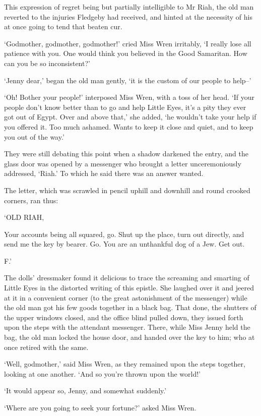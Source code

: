 This expression of regret being but partially intelligible to Mr Riah,
the old man reverted to the injuries Fledgeby had received, and hinted
at the necessity of his at once going to tend that beaten cur.

‘Godmother, godmother, godmother!’ cried Miss Wren irritably, ‘I really
lose all patience with you. One would think you believed in the Good
Samaritan. How can you be so inconsistent?’

‘Jenny dear,’ began the old man gently, ‘it is the custom of our people
to help--’

‘Oh! Bother your people!’ interposed Miss Wren, with a toss of her head.
‘If your people don’t know better than to go and help Little Eyes, it’s
a pity they ever got out of Egypt. Over and above that,’ she added, ‘he
wouldn’t take your help if you offered it. Too much ashamed. Wants to
keep it close and quiet, and to keep you out of the way.’

They were still debating this point when a shadow darkened the entry,
and the glass door was opened by a messenger who brought a letter
unceremoniously addressed, ‘Riah.’ To which he said there was an answer
wanted.

The letter, which was scrawled in pencil uphill and downhill and round
crooked corners, ran thus:


‘OLD RIAH,

Your accounts being all squared, go. Shut up the place, turn out
directly, and send me the key by bearer. Go. You are an unthankful dog
of a Jew. Get out.

F.’


The dolls’ dressmaker found it delicious to trace the screaming and
smarting of Little Eyes in the distorted writing of this epistle. She
laughed over it and jeered at it in a convenient corner (to the great
astonishment of the messenger) while the old man got his few goods
together in a black bag. That done, the shutters of the upper windows
closed, and the office blind pulled down, they issued forth upon the
steps with the attendant messenger. There, while Miss Jenny held the
bag, the old man locked the house door, and handed over the key to him;
who at once retired with the same.

‘Well, godmother,’ said Miss Wren, as they remained upon the steps
together, looking at one another. ‘And so you’re thrown upon the world!’

‘It would appear so, Jenny, and somewhat suddenly.’

‘Where are you going to seek your fortune?’ asked Miss Wren.

